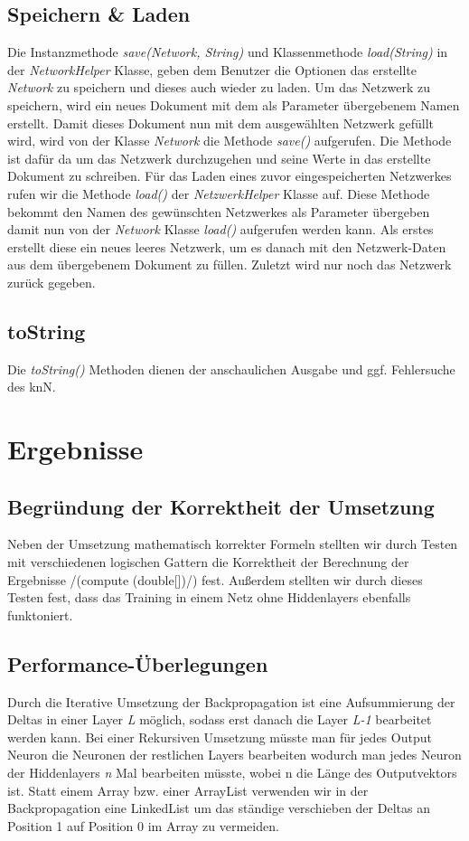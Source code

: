 \documentclass[paper=A4,pagesize=auto,12pt,headinclude=true,footinclude=true,BCOR=0mm,DIV=calc]{scrartcl}
\begin{document}
\subsection{Speichern \& Laden} %
Die Instanzmethode \textit{save(Network, String)} und Klassenmethode \textit{load(String)} in der \textit{NetworkHelper} Klasse, geben dem Benutzer die Optionen das erstellte \textit{Network} zu speichern und dieses auch wieder zu laden.
Um das Netzwerk zu speichern, wird ein neues Dokument mit dem als Parameter übergebenem Namen erstellt. Damit dieses Dokument nun mit dem ausgewählten Netzwerk gefüllt wird, wird von der Klasse \textit{Network} die Methode \textit{save()} aufgerufen. Die Methode ist dafür da um das Netzwerk durchzugehen und seine Werte in das
erstellte Dokument zu schreiben. Für das Laden eines zuvor eingespeicherten Netzwerkes rufen wir die Methode \textit{load()} der \textit{NetzwerkHelper} Klasse auf. Diese Methode bekommt den Namen des gewünschten Netzwerkes als Parameter übergeben damit nun von der \textit{Network} Klasse \textit{load()} aufgerufen werden kann. Als erstes erstellt diese ein neues leeres Netzwerk, um es danach mit den Netzwerk-Daten aus dem übergebenem Dokument zu füllen. Zuletzt wird nur noch das Netzwerk zurück gegeben.


\subsection{toString}
Die \textit{toString()} Methoden dienen der anschaulichen Ausgabe und ggf. Fehlersuche des knN. 

\newpage

\section{Ergebnisse}

\subsection{Begründung der Korrektheit der Umsetzung}
Neben der Umsetzung mathematisch korrekter Formeln stellten wir durch Testen mit verschiedenen logischen Gattern die Korrektheit der Berechnung der Ergebnisse /(compute (double[])/) fest.
Außerdem stellten wir durch dieses Testen fest, dass das Training in einem Netz ohne Hiddenlayers ebenfalls funktoniert.

\subsection{Performance-Überlegungen}
Durch die Iterative Umsetzung der Backpropagation ist eine Aufsummierung der Deltas in einer Layer \textit{L} möglich, sodass erst danach die Layer \textit{L-1} bearbeitet werden kann.
Bei einer Rekursiven Umsetzung müsste man für jedes Output Neuron die Neuronen der restlichen Layers bearbeiten wodurch man jedes Neuron der Hiddenlayers \textit{n} Mal bearbeiten müsste, wobei n die Länge des Outputvektors ist.
Statt einem Array bzw. einer ArrayList verwenden wir in der Backpropagation eine LinkedList um das ständige verschieben der Deltas an Position 1 auf Position 0 im Array zu vermeiden.
\end{document}
